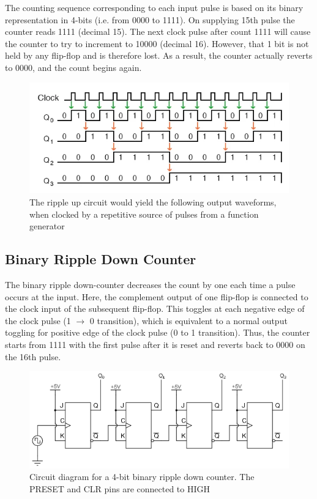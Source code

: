 The counting sequence corresponding to each input pulse is based on its binary representation in 4-bits (i.e. from 0000 to 1111). On supplying 15th pulse the counter reads 1111 (decimal 15). The next clock
pulse after count 1111 will cause the counter to try to increment to 10000 (decimal 16).
However, that 1 bit is not held by any flip-flop and is therefore lost. As a result, the
counter actually reverts to 0000, and the count begins again.

\begin{figure}[H]
    \centering
    \includegraphics[width=1\columnwidth]{images/upplot.png}
    \caption{The ripple up circuit would yield the following output waveforms, when clocked by a repetitive source of pulses from a function generator}
    \label{upp}
\end{figure}
\subsection{Binary Ripple Down Counter}

The binary ripple down-counter decreases the count by one each time a pulse
occurs at the input. Here, the complement
output of one flip-flop is   connected to the clock input of the subsequent flip-flop. This toggles at each negative edge of the clock pulse (1 $\rightarrow$ 0 transition),
which is equivalent to a normal output toggling for positive edge of the clock pulse (0 to
1 transition). Thus, the counter starts from 1111 with the first pulse after it is reset and reverts
back to 0000 on the 16th pulse.

\begin{figure}[H]
    \centering
    \includegraphics[width=1\columnwidth]{images/down.png}
    \caption{Circuit diagram for a 4-bit binary ripple down counter. The PRESET and CLR pins are connected to HIGH}
    \label{down}
\end{figure}
